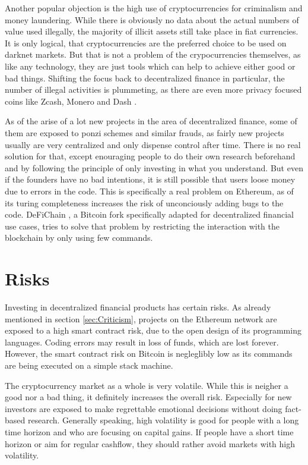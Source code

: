 Another popular objection is the high use of cryptocurrencies for criminalism and money laundering. While there is obviously no data about the
actual numbers of value used illegally, the majority of illicit assets still take place in fiat currencies. It is only logical, that
cryptocurrencies are the preferred choice to be used on darknet markets. But that is not a problem of the crypocurrencies themselves, as like any
technology, they are just tools which can help to achieve either good or bad things. Shifting the focus back to decentralized finance in particular,
the number of illegal activities is plummeting, as there are even more privacy focused coins like Zcash, Monero and Dash \cite[p.\ 13]{FDD2018}.

As of the arise of a lot new projects in the area of decentralized finance, some of them are exposed to ponzi schemes and similar frauds, as
fairly new projects usually are very centralized and only dispense control after time. There is no real solution for that, except enouraging
people to do their own research beforehand and by following the principle of only investing in what you understand. But even if the founders
have no bad intentions, it is still possible that users loose money due to errors in the code. This is specifically a real problem on
Ethereum, as of its turing completeness increases the risk of unconciously adding bugs to the code. DeFiChain \cite{DeFiChain}, 
a Bitcoin fork specifically adapted for decentralized financial use cases, tries to solve that problem by restricting the interaction with the
blockchain by only using few commands.

\section{Risks}
Investing in decentralized financial products has certain risks. As already mentioned in section \ref{sec:Criticism}, projects on the Ethereum
network are exposed to a high smart contract risk, due to the open design of its programming languages. Coding errors may result in loss of
funds, which are lost forever. However, the smart contract risk on Bitcoin is negleglibly low as its commands are being executed on a simple
stack machine.

The cryptocurrency market as a whole is very volatile. While this is neigher a good nor a bad thing, it definitely increases the overall risk.
Especially for new investors are exposed to make regrettable emotional decisions without doing fact-based research. Generally speaking, high
volatility is good for people with a long time horizon and who are focusing on capital gains. If people have a short time horizon or aim for
regular cashflow, they should rather avoid markets with high volatility.

